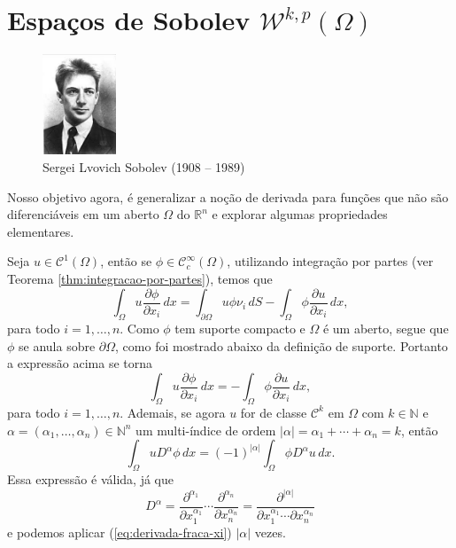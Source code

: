 \documentclass[a4paper, 11pt]{book}
\theoremstyle{definition}
\newcommand{\bN}{\mathbb{N}}
\newcommand{\bR}{\mathbb{R}}
\newcommand{\cC}{\mathcal{C}}
\newcommand{\cW}{\mathcal{W}}
\begin{document}
\section{Espaços de Sobolev $\cW^{k,p}(\Omega)$}

\begin{figure}
    \centering
    \includegraphics[height=3cm]{sobolev.jpg}
    \caption{Sergei Lvovich Sobolev (1908 -- 1989)}
\end{figure}

Nosso objetivo agora, é generalizar a noção de derivada para funções que não são diferenciáveis em um aberto $\Omega$ do $\bR^n$ e explorar algumas propriedades elementares.

Seja $u \in \cC^1(\Omega)$, então se $\phi \in \cC^\infty_c(\Omega)$, utilizando integração por partes (ver Teorema \ref{thm:integracao-por-partes}), temos que
\[
    \int_\Omega u \dfrac{\partial \phi}{\partial x_i} \,dx = \int_{\partial\Omega} u\phi \nu_i \, dS- \int_\Omega \phi \dfrac{\partial u}{\partial x_i} \,dx,
\]
para todo $i = 1,\dots,n$. Como $\phi$ tem suporte compacto e $\Omega$ é um aberto, segue que $\phi$ se anula sobre $\partial\Omega$, como foi mostrado abaixo da definição de suporte. Portanto a expressão acima se torna
\begin{equation} \label{eq:derivada-fraca-xi}
    \int_\Omega u \dfrac{\partial \phi}{\partial x_i} \,dx = - \int_\Omega \phi \dfrac{\partial u}{\partial x_i} \,dx,
\end{equation}
para todo $i = 1,\dots,n$.
Ademais, se agora $u$ for de classe $\cC^k$ em $\Omega$ com $k \in \bN$ e $\alpha = (\alpha_1,\dots,\alpha_n) \in \bN^n$ um multi-índice de ordem $|\alpha| = \alpha_1 + \cdots + \alpha_n = k$, então
\begin{equation} \label{eq:derivada-fraca-dalpha}
    \int_\Omega u D^\alpha \phi \,dx = (-1)^{|\alpha|} \int_\Omega \phi D^\alpha u \,dx.
\end{equation}
Essa expressão é válida, já que
\[
    D^\alpha = \dfrac{\partial^{\alpha_1} }{\partial x_1^{\alpha_1}} \cdots \dfrac{\partial^{\alpha_n} }{\partial x_n^{\alpha_n}} = \dfrac{\partial^{|\alpha|} }{\partial x_1^{\alpha_1} \cdots \partial x_n^{\alpha_n}}
\]
e podemos aplicar (\ref{eq:derivada-fraca-xi}) $|\alpha|$ vezes.
\end{document}
